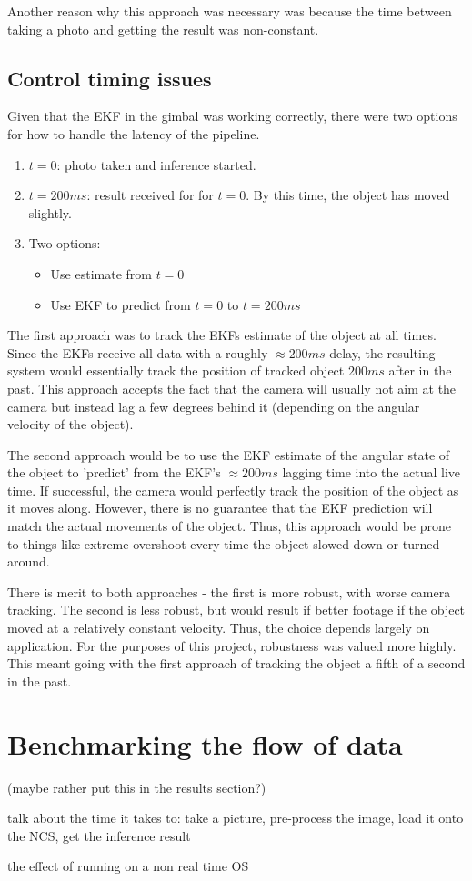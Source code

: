 Another reason why this approach was necessary was because the time between taking a photo and getting the result was non-constant.

\subsection{Control timing issues}
Given that the EKF in the gimbal was working correctly, there were two options for how to handle the latency of the pipeline.

\begin{enumerate}
\item $t = 0$: photo taken and inference started.
\item $t = 200ms$: result received for for $t=0$. By this time, the object has moved slightly.
\item Two options:
	\begin{itemize}
	\item Use estimate from $t=0$
	\item Use EKF to predict from $t=0$ to $t=200ms$
	\end{itemize}
\end{enumerate}

The first approach was to track the EKFs estimate of the object at all times. Since the EKFs receive all data with a roughly $\approx 200ms$ delay, the resulting system would essentially track the position of tracked object $200ms$ after in the past. This approach accepts the fact that the camera will usually not aim at the camera but instead lag a few degrees behind it (depending on the angular velocity of the object).

The second approach would be to use the EKF estimate of the angular state of the object to 'predict' from the EKF's $\approx 200ms$ lagging time into the actual live time. If successful, the camera would perfectly track the position of the object as it moves along. However, there is no guarantee that the EKF prediction will match the actual movements of the object. Thus, this approach would be prone to things like extreme overshoot every time the object slowed down or turned around.

There is merit to both approaches - the first is more robust, with worse camera tracking. The second is less robust, but would result if better footage if the object moved at a relatively constant velocity. Thus, the choice depends largely on application. For the purposes of this project, robustness was valued more highly. This meant going with the first approach of tracking the object a fifth of a second in the past.


\section{Benchmarking the flow of data}
{\Large \color{red} (maybe rather put this in the results section?)}

{\Large \color{red} talk about the time it takes to: take a picture, pre-process the image, load it onto the NCS, get the inference result}

{\Large \color{red} the effect of running on a non real time OS}

